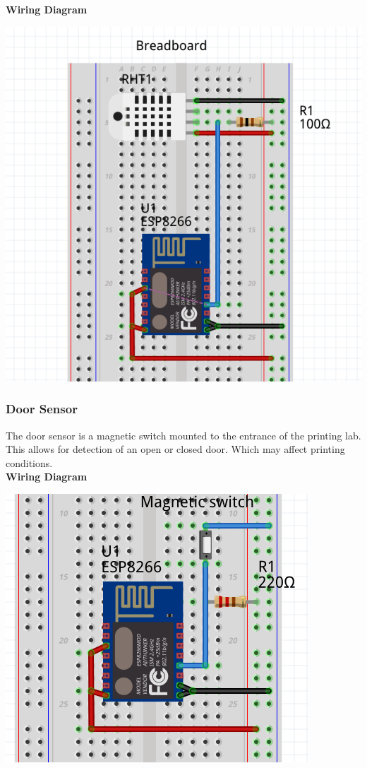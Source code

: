       \textbf{Wiring Diagram}\\
            \begin{center}
      \includegraphics[scale=0.25]{images/temp-diagram.png}
\end{center}

    \subsubsection{Door Sensor}
      The door sensor is a magnetic switch mounted to the entrance of the printing lab.
      This allows for detection of an open or closed door. Which may affect printing conditions.\\

      \textbf{Wiring Diagram}\\
      \begin{center}
        \includegraphics[scale=0.25]{images/door-cir.png}
        \end{center}
